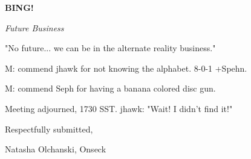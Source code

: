 \documentclass[12pt]{article}
\newcommand{\bing}{{\bf BING!} }
\newcommand{\goto}[1]{\bing \vskip 12pt \centerline{{\em{#1}}}}
\begin{document}
\goto{Future Business}

"No future... we can be in the alternate reality business."

M: commend jhawk for not knowing the alphabet. 8-0-1 +Spehn.

M: commend Seph for having a banana colored disc gun.

\vspace{12pt}

\noindent
Meeting adjourned, 1730 SST. jhawk: "Wait! I didn't find it!"

\vspace{18pt}

\centerline{Respectfully submitted,}
\centerline{Natasha Olchanski, Onseck}
\end{document}
